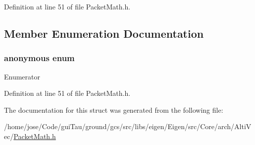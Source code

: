 Definition at line 51 of file Packet\-Math.\-h.



\subsection{Member Enumeration Documentation}
\hypertarget{structei__unpacket__traits_3_01v4f_01_4_a4e99531872859b60eebef7234a0d213d}{\subsubsection[{anonymous enum}]{\setlength{\rightskip}{0pt plus 5cm}anonymous enum}}\label{structei__unpacket__traits_3_01v4f_01_4_a4e99531872859b60eebef7234a0d213d}
\begin{Desc}
\item[Enumerator]\par
\begin{description}
\item[{\em 
\hypertarget{structei__unpacket__traits_3_01v4f_01_4_a4e99531872859b60eebef7234a0d213dabe119704ef2b9a1be1dc7695a0119700}{size}\label{structei__unpacket__traits_3_01v4f_01_4_a4e99531872859b60eebef7234a0d213dabe119704ef2b9a1be1dc7695a0119700}
}]\end{description}
\end{Desc}


Definition at line 51 of file Packet\-Math.\-h.



The documentation for this struct was generated from the following file\-:\begin{DoxyCompactItemize}
\item 
/home/jose/\-Code/gui\-Tau/ground/gcs/src/libs/eigen/\-Eigen/src/\-Core/arch/\-Alti\-Vec/\hyperlink{_alti_vec_2_packet_math_8h}{Packet\-Math.\-h}\end{DoxyCompactItemize}
